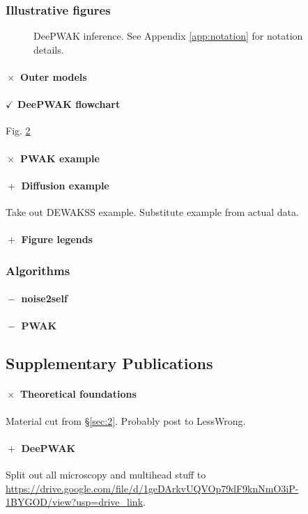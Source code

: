 \subsubsection{Illustrative figures}

\begin{figure}
     \begin{subfigure}[b]{0.5\textwidth}
        
         \caption{}
         \label{fig:}
     \end{subfigure}
     \hfill
     
     \caption{DeePWAK inference.
       See Appendix \ref{app:notation} for notation details.
     }
     \label{fig:deepwak}
\end{figure}

\paragraph{$\boxed{\times}$ Outer models}
\paragraph{$\boxed{\checkmark}$ DeePWAK flowchart}
Fig. \ref{fig:deepwak}
\paragraph{$\boxed{\times}$ PWAK example}
\paragraph{$\boxed{+}$ Diffusion example}
Take out DEWAKSS example. Substitute example from actual data.
\paragraph{$\boxed{+}$ Figure legends}

\subsubsection{Algorithms}
\paragraph{$\boxed{-}$ noise2self}
\paragraph{$\boxed{-}$ PWAK}

\subsection{Supplementary Publications}
\paragraph{$\boxed{\times}$ Theoretical foundations}
Material cut from \S \ref{sec:2}. Probably post to LessWrong.
\paragraph{$\boxed{+}$ DeePWAK}
Split out all microscopy and multihead stuff to
\url{https://drive.google.com/file/d/1geDArkvUQVOp79dF9knNmO3iP-1BYGOD/view?usp=drive_link}.
